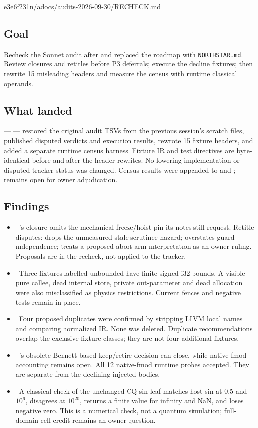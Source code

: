 %
  {e3e6f231}{n/a}{docs/audits-2026-09-30/RECHECK.md}

\subsection*{Goal}
Recheck the Sonnet audit after  and 
replaced the roadmap with \texttt{NORTHSTAR.md}. Review closures and retitles
before P3 deferrals; execute the decline fixtures; then rewrite 15 misleading
headers and measure the census with runtime classical operands.

\subsection*{What landed}
 ---  --- restored the original audit TSVs from the
previous session's scratch files, published disputed verdicts and execution
results, rewrote 15 fixture headers, and added a separate runtime census harness.
Fixture IR and test directives are byte-identical before and after the header
rewrites. No lowering implementation or disputed tracker status was changed.
Census results were appended to  and ;  remains
open for owner adjudication.

\subsection*{Findings}
\begin{itemize}
  \item \fdoc\ 's closure omits the mechanical freeze/hoist pin its
    notes still request. Retitle disputes:  drops the unmeasured stale
    scrutinee hazard;  overstates guard independence;  treats a
    proposed abort-arm interpretation as an owner ruling. Proposals are in the
    recheck, not applied to the tracker.
  \item \foverdecline\ Three fixtures labelled unbounded have finite signed-i32
    bounds. A visible pure callee, dead internal store, private out-parameter
    and dead allocation were also misclassified as physics restrictions.
    Current fences and negative tests remain in place.
  \item \fdoc\ Four proposed duplicates were confirmed by stripping LLVM local
    names and comparing normalized IR. None was deleted. Duplicate recommendations
    overlap the exclusive fixture classes; they are not four additional fixtures.
  \item \fdoc\ 's obsolete Bennett-based keep/retire decision can
    close, while native-fmod accounting remains open. All 12 native-fmod runtime
    probes accepted. They are separate from the declining injected bodies.
  \item \fdoc\ A classical check of the unchanged CQ sin leaf matches host sin
    at 0.5 and $10^6$, disagrees at $10^{20}$, returns a finite value for infinity
    and NaN, and loses negative zero. This is a numerical check, not a quantum
    simulation; full-domain cell credit remains an owner question.
\end{itemize}

